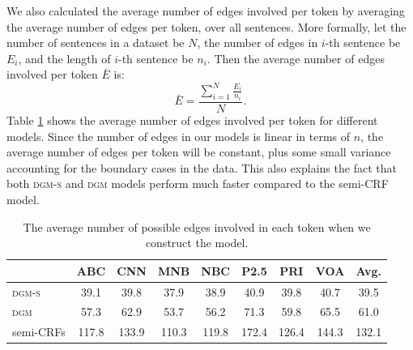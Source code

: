 We also calculated the average number of edges involved per token by averaging the average number of edges per token, over all sentences. More formally, let the number of sentences in a dataset be $N$,  the number of edges in $i$-th sentence be $E_i$, and the length of $i$-th sentence be $n_i$. Then the average number of edges involved per token $\bar{E}$ is:
\begin{equation*}
\bar{E} = \frac{\displaystyle\sum_{i=1}^{N}\frac{E_{i}}{n_{i}}}{N}.
\end{equation*}
Table \ref{tab:edges} shows the average number of edges involved per token for different models.
Since the number of edges in our models is linear in terms of $n$, the average number of edges per token will be constant, plus some small variance accounting for the boundary cases in the data.
This also explains the fact that both \textsc{dgm-s} and \textsc{dgm} models perform much faster compared to the semi-CRF model.

\begin{table}[h!]
	\centering
	\begin{tabular}{lcccccccc}
		\toprule
		& ABC & CNN  & MNB & NBC & P2.5 & PRI & VOA & Avg. \\ 
		\midrule
		\textsc{dgm-s} & 39.1 & 39.8 & 37.9 & 38.9 & 40.9 & 39.8 & 40.7 &39.5\\
		\textsc{dgm} & 57.3 & 62.9 & 53.7 & 56.2 & 71.3 & 59.8 & 65.5& 61.0  \\
		semi-CRFs & 117.8 & 133.9 & 110.3 & 119.8 & 172.4 & 126.4 & 144.3 & 132.1 \\\bottomrule
	\end{tabular}
	\caption{The average number of possible edges involved in each token when we construct the model. }
	\label{tab:edges}
\end{table}





